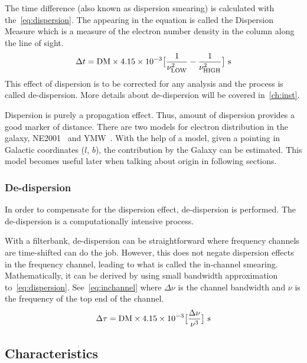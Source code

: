 \par The time difference (also known as dispersion smearing) is calculated with the~\ref{eq:dispersion}. The \dm appearing in the equation is called the Dispersion Measure which is a measure of the electron number density in the column along the line of sight.
\begin{equation}
\label{eq:dispersion}
\Delta t = {\rm DM} \times 4.15 \times 10^{-3} \big[  \frac{1}{\nu^2_{\rm LOW}} - \frac{1}{\nu^2_{\rm HIGH}} \big]\ {\rm s}
\end{equation}
This effect of dispersion is to be corrected for any analysis and the process is called de-dispersion. More details about de-dispersion will be covered in~\autoref{ch:inst}.

\par Dispersion is purely a propagation effect. Thus, amount of dispersion provides a good marker of distance. There are two models for electron distribution in the galaxy, NE2001~\cite{ne2001} and YMW~\cite{ymw16}. With the help of a model, given a pointing in Galactic coordinates ($l$, $b$), the \dm contribution by the Galaxy can be estimated. This model becomes useful later when talking about \frb{} origin in following sections. 

\subsubsection {De-dispersion}
\label{sssub:dd}

\par In order to compensate for the dispersion effect, de-dispersion is performed. The de-dispersion is a computationally intensive process.
\par With a filterbank, de-dispersion can be straightforward where frequency channels are time-shifted can do the job. 
However, this does not negate dispersion effects in the frequency channel, leading to what is called the in-channel smearing.
Mathematically, it can be derived by using small bandwidth approximation to~\autoref{eq:dispersion}. 
See~\autoref{eq:inchannel} where $\Delta \nu$ is the channel bandwidth and $\nu$ is the frequency of the top end of the channel.
\begin{equation}
\label{eq:inchannel}
\Delta \tau = {\rm DM} \times 4.15 \times 10^{-3} \big[  \frac{\Delta \nu}{\nu^3}  \big]\ {\rm s}
\end{equation}

\subsection{Characteristics}
\label{ssub:frb}

